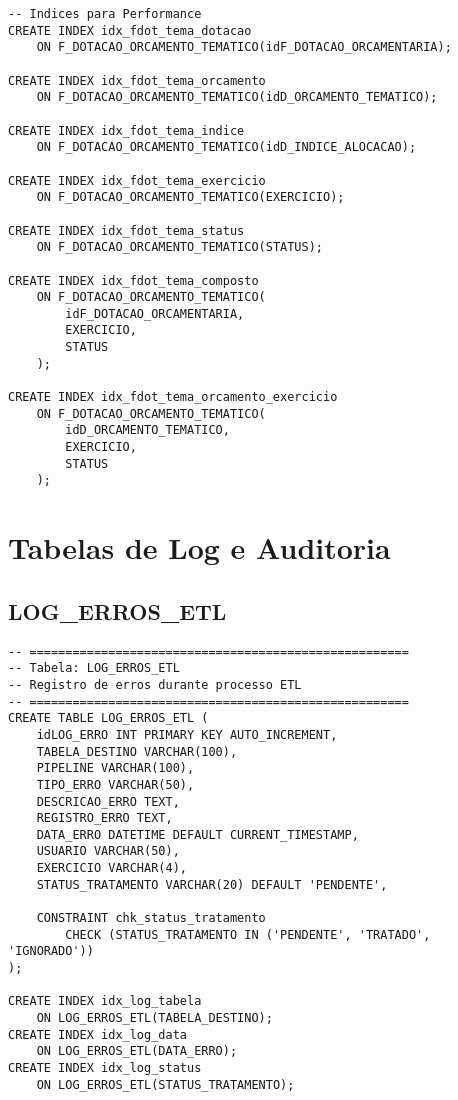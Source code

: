 \documentclass[12pt,a4paper]{article}
\begin{document}
\begin{lstlisting}
-- Indices para Performance
CREATE INDEX idx_fdot_tema_dotacao 
    ON F_DOTACAO_ORCAMENTO_TEMATICO(idF_DOTACAO_ORCAMENTARIA);
    
CREATE INDEX idx_fdot_tema_orcamento 
    ON F_DOTACAO_ORCAMENTO_TEMATICO(idD_ORCAMENTO_TEMATICO);
    
CREATE INDEX idx_fdot_tema_indice 
    ON F_DOTACAO_ORCAMENTO_TEMATICO(idD_INDICE_ALOCACAO);
    
CREATE INDEX idx_fdot_tema_exercicio 
    ON F_DOTACAO_ORCAMENTO_TEMATICO(EXERCICIO);
    
CREATE INDEX idx_fdot_tema_status 
    ON F_DOTACAO_ORCAMENTO_TEMATICO(STATUS);
    
CREATE INDEX idx_fdot_tema_composto 
    ON F_DOTACAO_ORCAMENTO_TEMATICO(
        idF_DOTACAO_ORCAMENTARIA, 
        EXERCICIO, 
        STATUS
    );

CREATE INDEX idx_fdot_tema_orcamento_exercicio 
    ON F_DOTACAO_ORCAMENTO_TEMATICO(
        idD_ORCAMENTO_TEMATICO, 
        EXERCICIO, 
        STATUS
    );
\end{lstlisting}

\section{Tabelas de Log e Auditoria}

\subsection{LOG\_ERROS\_ETL}

\begin{lstlisting}
-- =====================================================
-- Tabela: LOG_ERROS_ETL
-- Registro de erros durante processo ETL
-- =====================================================
CREATE TABLE LOG_ERROS_ETL (
    idLOG_ERRO INT PRIMARY KEY AUTO_INCREMENT,
    TABELA_DESTINO VARCHAR(100),
    PIPELINE VARCHAR(100),
    TIPO_ERRO VARCHAR(50),
    DESCRICAO_ERRO TEXT,
    REGISTRO_ERRO TEXT,
    DATA_ERRO DATETIME DEFAULT CURRENT_TIMESTAMP,
    USUARIO VARCHAR(50),
    EXERCICIO VARCHAR(4),
    STATUS_TRATAMENTO VARCHAR(20) DEFAULT 'PENDENTE',
    
    CONSTRAINT chk_status_tratamento 
        CHECK (STATUS_TRATAMENTO IN ('PENDENTE', 'TRATADO', 'IGNORADO'))
);

CREATE INDEX idx_log_tabela 
    ON LOG_ERROS_ETL(TABELA_DESTINO);
CREATE INDEX idx_log_data 
    ON LOG_ERROS_ETL(DATA_ERRO);
CREATE INDEX idx_log_status 
    ON LOG_ERROS_ETL(STATUS_TRATAMENTO);
\end{lstlisting}
\end{document}
